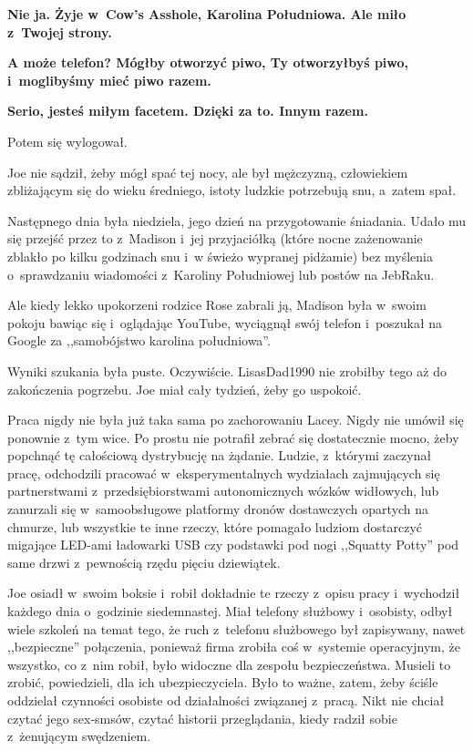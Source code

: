 \documentclass[oneside,polish,11pt,sfheadings]{mwbk}
\begin{document}
\textbf{ Nie ja. Żyje w~Cow's Asshole, Karolina
Południowa. Ale miło z~Twojej strony.}

\textbf{ A może telefon? Mógłby otworzyć piwo, Ty
otworzyłbyś piwo, i~moglibyśmy mieć piwo razem.}

\textbf{ Serio, jesteś miłym facetem. Dzięki za to. Innym
razem.}

Potem się wylogował.

Joe nie sądził, żeby mógł spać tej nocy, ale był mężczyzną, człowiekiem
zbliżającym się do wieku średniego, istoty ludzkie potrzebują snu, a~zatem spał.

Następnego dnia była niedziela, jego dzień na przygotowanie śniadania.
Udało mu się przejść przez to z~Madison i~jej przyjaciółką (które nocne
zażenowanie zblakło po kilku godzinach snu i~w świeżo wypranej pidżamie)
bez myślenia o~sprawdzaniu wiadomości z~Karoliny Południowej lub postów
na JebRaku.

Ale kiedy lekko upokorzeni rodzice Rose zabrali ją, Madison była w~swoim
pokoju bawiąc się i~oglądając YouTube, wyciągnął swój telefon i~poszukał
na Google za ,,samobójstwo karolina południowa''.

Wyniki szukania była puste. Oczywiście. LisasDad1990 nie zrobiłby tego
aż do zakończenia pogrzebu. Joe miał cały tydzień, żeby go uspokoić.

Praca nigdy nie była już taka sama po zachorowaniu Lacey. Nigdy nie
umówił się ponownie z~tym wice. Po prostu nie potrafił zebrać się
dostatecznie mocno, żeby popchnąć tę całościową dystrybucję na żądanie.
Ludzie, z~którymi zaczynał pracę, odchodzili pracować w~eksperymentalnych wydziałach zajmujących się partnerstwami z~przedsiębiorstwami autonomicznych wózków widłowych, lub zanurzali się w~samoobsługowe platformy dronów dostawczych opartych na chmurze, lub
wszystkie te inne rzeczy, które pomagało ludziom dostarczyć migające
LED-ami ładowarki USB czy podstawki pod nogi ,,Squatty Potty'' pod same
drzwi z~pewnością rzędu pięciu dziewiątek.

Joe osiadł w~swoim boksie i~robił dokładnie te rzeczy z~opisu pracy i~wychodził każdego dnia o~godzinie siedemnastej. Miał telefony służbowy i~osobisty, odbył wiele szkoleń na temat tego, że ruch z~telefonu
służbowego był zapisywany, nawet ,,bezpieczne'' połączenia, ponieważ
firma zrobiła coś w~systemie operacyjnym, że wszystko, co z~nim robił,
było widoczne dla zespołu bezpieczeństwa. Musieli to zrobić,
powiedzieli, dla ich ubezpieczyciela. Było to ważne, zatem, żeby ściśle
oddzielał czynności osobiste od działalności związanej z~pracą. Nikt nie
chciał czytać jego sex-smsów, czytać historii przeglądania, kiedy radził
sobie z~żenującym swędzeniem.
\end{document}
